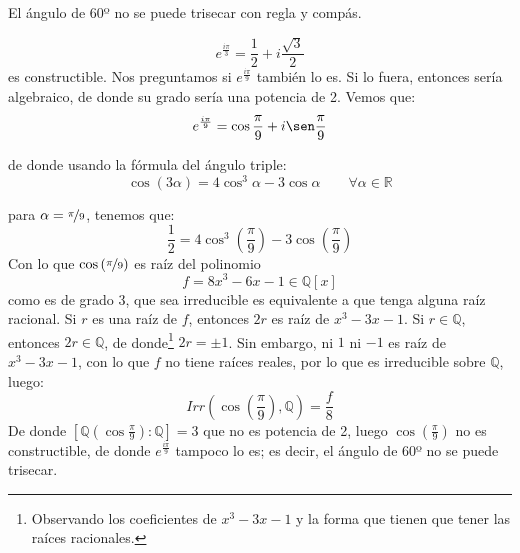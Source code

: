 \begin{ejemplo}
    El ángulo de 60º no se puede trisecar con regla y compás.
    \begin{figure}[H]
        \centering
    \end{figure}
    \begin{equation*}
        e^{\frac{i\pi}{3}} = \dfrac{1}{2} + i\dfrac{\sqrt{3}}{2}
    \end{equation*}
    es constructible. Nos preguntamos si $e^{\frac{i\pi}{9}}$ también lo es. Si lo fuera, entonces sería algebraico, de donde su grado sería una potencia de 2. Vemos que:
    \begin{equation*}
        e^{\frac{i\pi}{9}} = \cos \dfrac{\pi}{9} + i\sen \dfrac{\pi}{9}
    \end{equation*}

    de donde usando la fórmula del ángulo triple:
    \begin{equation*}
        \cos(3\alpha) = 4\cos^3\alpha - 3\cos \alpha \qquad \forall \alpha\in \mathbb{R}
    \end{equation*}

    para $\alpha = \nicefrac{\pi}{9}$, tenemos que:
    \begin{equation*}
        \dfrac{1}{2} = 4\cos^3\left(\frac{\pi}{9}\right) - 3\cos\left(\frac{\pi}{9}\right)
    \end{equation*}
    Con lo que $\cos\left(\nicefrac{\pi}{9}\right)$ es raíz del polinomio
    \begin{equation*}
        f = 8x^3-6x-1 \in \mathbb{Q}[x]
    \end{equation*}
    como es de grado 3, que sea irreducible es equivalente a que tenga alguna raíz racional. Si $r$ es una raíz de $f$, entonces $2r$ es raíz de $x^3-3x-1$. Si $r\in \mathbb{Q}$, entonces $2r\in \mathbb{Q}$, de donde\footnote{Observando los coeficientes de $x^3-3x-1$ y la forma que tienen que tener las raíces racionales.} $2r=\pm 1$. Sin embargo, ni $1$ ni $-1$ es raíz de $x^3-3x-1$, con lo que $f$ no tiene raíces reales, por lo que es irreducible sobre $\mathbb{Q}$, luego:
    \begin{equation*}
        Irr\left(\cos\left(\frac{\pi}{9}\right), \mathbb{Q}\right) = \frac{f}{8}
    \end{equation*}
    De donde $[\mathbb{Q}\left(\cos\frac{\pi}{9}\right) : \mathbb{Q}] = 3$ que no es potencia de 2, luego $\cos\left(\frac{\pi}{9}\right)$ no es constructible, de donde $e^{\frac{i\pi}{9}}$ tampoco lo es; es decir, el ángulo de $60$º no se puede trisecar.
\end{ejemplo}

